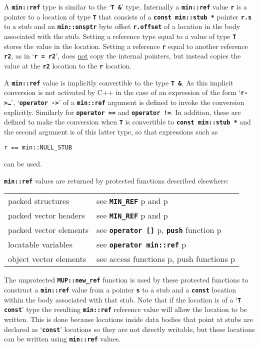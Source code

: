 \documentclass[12pt]{article}
\newcommand{\TT}[1]{{\tt \bfseries #1}}
\newcommand{\pagref}[1]{p\pageref{#1}}
\newcommand{\EOL}{\penalty \exhyphenpenalty}
\begin{document}
A \TT{min::ref\TARG} type is similar to the `\TT{T \&}' type.
Internally a \TT{min::ref\TARG} value \TT{r}
is a pointer to a location of type \TT{T} that
consists of a \TT{const min::\EOL stub~*} pointer \TT{r.s} to a stub
and an \TT{min::\EOL unsptr} byte offset \TT{r.offset}
of a location in the body
associated with the stub.  Setting a reference type equal to a value
of type \TT{T} stores the value in the location.  Setting a reference
\TT{r} equal to another reference \TT{r2}, as in `\TT{r~=~r2}', does
\underline{not} copy the internal pointers, but instead copies the
value at the \TT{r2} location to the \TT{r} location.

A \TT{min::ref\TARG} value is implicitly convertible to the type \TT{T \&}.
As this implicit conversion
is not activated by C++ in the case of an expression of the form
`\TT{r->\ldots}', `\TT{operator~->}' of a \TT{min::\EOL ref\TARG}
argument is defined to invoke the conversion explicitly.
Similarly for \TT{operator ==} and \TT{operator !=}.
In addition, these are defined to make the conversion when
\TT{T} is convertible to \TT{const min::\EOL stub~*} and the
second argument is of this latter type, so that expressions such as
\begin{center}
\tt r == min::NULL\_STUB
\end{center}
can be used.

\TT{min::ref\TARG} values are returned by protected functions described
elsewhere:
\begin{center}
\begin{tabular}{ll}
packed structures & see \TT{MIN\_REF}
    \pagref{MIN_REF} and \pagref{PACKED_STRUCT_MIN_REF} \\
packed vector headers & see \TT{MIN\_REF}
    \pagref{MIN_REF} and \pagref{PACKED_VEC_MIN_REF} \\
packed vector elements	& see \TT{operator []}
    \pagref{PACKED_VEC_[]_REF},
    \TT{push} function \pagref{PACKED_VEC_PUSH_REF} \\
locatable variables	& see \TT{operator min::ref\TARG}
    \pagref{LOCATABLE_VAR_REF} \\
object vector elements	& see access functions \pagref{OBJ_VEC_UPDPTR_REF},
			  push functions \pagref{OBJ_VEC_UPDPTR_PUSH_REF}
\end{tabular}
\end{center}

The unprotected \TT{MUP::new\_ref} function is used by these
protected functions to construct a \TT{min::\EOL ref\TARG} value
from a pointer \TT{s} to a stub and a \TT{const} location
within the body associated with that stub.  Note that if the
location is of a `\TT{T const}' type the resulting
\TT{min::\EOL ref\TARG} reference value will allow the location
to be written.  This is done because locations inside data bodies
that point at stubs are declared as `\TT{const}' locations
so they are not directly writable, but these locations can be
written using \TT{min::\EOL ref\TARG} values.
\end{document}
